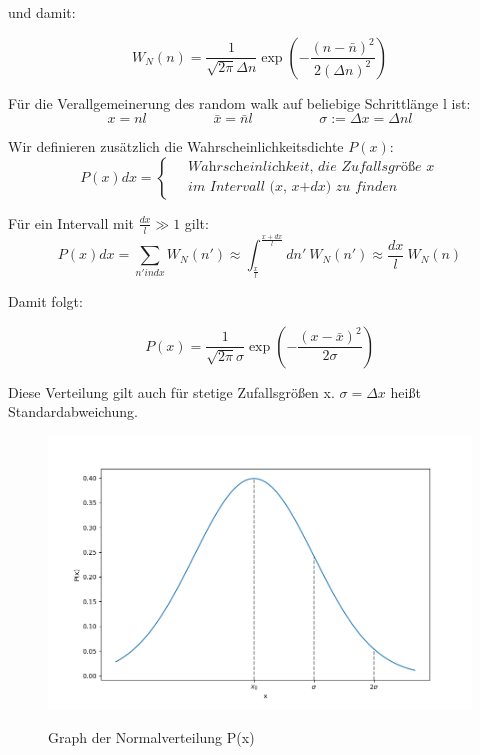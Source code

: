 \documentclass[ngerman]{scrartcl}
\begin{document}
	und damit:
	
	\begin{equation}
		W_N(n)=\frac{1}{\sqrt{2\pi}\Delta n}\exp\left( -\frac{(n-\bar{n})^2}{2(\Delta n)^2}\right)
	\end{equation}
	
	Für die Verallgemeinerung des random walk auf beliebige Schrittlänge l ist:
	\begin{equation}
		x=nl \hspace{2cm} \bar{x}=\bar{n}l \hspace{2cm} \sigma :=\Delta x= \Delta nl
	\end{equation}
	
	Wir definieren zusätzlich die Wahrscheinlichkeitsdichte $P(x)$:
	\begin{equation}
		P(x)dx=\begin{cases}~&\textit{Wahrscheinlichkeit, die Zufallsgröße x} \\~&\textit{im Intervall (x, x+dx) zu finden}\end{cases}
	\end{equation}
	
	Für ein Intervall mit $\frac{dx}{l}\gg 1 $ gilt:
	\begin{equation}
		P(x)dx=\sum_{n' in dx} W_N(n') \approx \int_{\frac{x}{l}}^{\frac{x+dx}{l}} dn'~W_N(n')\approx\frac{dx}{l}~W_N(n)
	\end{equation}
	
	Damit folgt:
	
	\begin{equation}\tag{Normalverteilung}
		P(x)=\frac{1}{\sqrt{2\pi}\sigma}\exp\left(-\frac{(x-\bar{x})^2}{2\sigma}\right)
	\end{equation}
	
	Diese Verteilung gilt auch für stetige Zufallsgrößen x. $\sigma =\Delta x$ heißt Standardabweichung. 
	
	\begin{figure}[h]
		\centering
		\includegraphics[width=0.85\linewidth]{Normalverteilung.png}
		\label{fig:normalverteilung}
		\caption{Graph der Normalverteilung P(x)}
	\end{figure}
	
\end{document}
